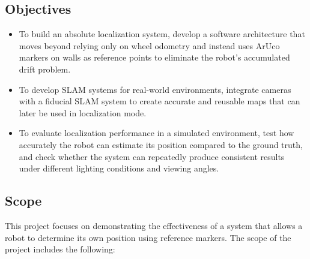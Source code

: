 \documentclass[10pt]{article}
\begin{document}
\subsection{Objectives}
\begin{itemize}
    \item To build an absolute localization system, develop a software architecture that moves beyond relying only on wheel odometry and instead uses ArUco markers on walls as reference points to eliminate the robot's accumulated drift problem.
    \item To develop SLAM systems for real-world environments, integrate cameras with a fiducial SLAM system to create accurate and reusable maps that can later be used in localization mode.
    \item To evaluate localization performance in a simulated environment, test how accurately the robot can estimate its position compared to the ground truth, and check whether the system can repeatedly produce consistent results under different lighting conditions and viewing angles.
\end{itemize}

\subsection{Scope}

This project focuses on demonstrating the effectiveness of a system that allows a robot to determine its own position using reference markers. The scope of the project includes the following:
\end{document}
